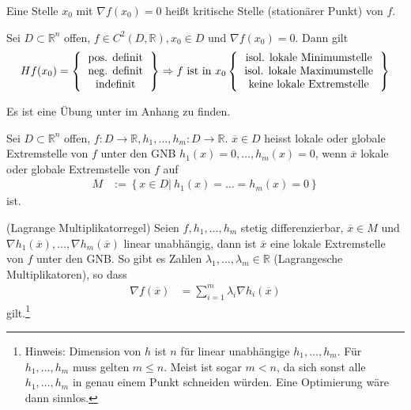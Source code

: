 \begin{defi}
 Eine Stelle $x_0$ mit $\nabla f(x_0)=0$ heißt kritische Stelle (stationärer Punkt) von $f$.
\end{defi}
\begin{satz}\label{satz:2}
Sei $D\subset\mathbb{R}^n$ offen, $f\in C^2(D,\mathbb{R}),x_0\in D$ und $\nabla f(x_0)=0$. Dann gilt 
\begin{align*}
H f(x_0)=\left\{\begin{tabular}{c}pos. definit\\neg. definit\\ indefinit \end{tabular} \right\}\Rightarrow f\text{ ist in }x_0\left\{\begin{tabular}{c}isol. lokale Minimumstelle\\
isol. lokale Maximumstelle\\
keine lokale Extremstelle \end{tabular} \right\}
\end{align*}
\end{satz}
Es ist eine Übung unter  im Anhang zu finden.
\begin{defi}
Sei $D\subset\mathbb{R}^n$ offen, $f:D\rightarrow\mathbb{R},h_1,\ldots,h_m:D\rightarrow\mathbb{R}$. $\overline{x}\in D$ heisst lokale oder globale Extremstelle von $f$ unter den
\ac{GNB} $h_1(x)=0,\ldots,h_m(x)=0$, wenn $\overline{x}$ lokale oder globale Extremstelle von $f$ auf
\begin{align*}
M &:=\left\{x\in D|\ h_1(x)=\ldots=h_m(x)=0\right\}
\end{align*}
ist.
\end{defi}
\begin{satz}\label{satz:3}
(Lagrange Multiplikatorregel) Seien $f,h_1,\ldots,h_m$ stetig differenzierbar, $\overline{x}\in M$ und $\nabla h_1(\overline{x}),\ldots,\nabla h_m(\overline{x})$ linear unabhängig, dann
ist $\overline{x}$ eine lokale Extremstelle von $f$ unter den \ac{GNB}. So gibt es Zahlen $\lambda_1,\ldots,\lambda_m\in\mathbb{R}$ (Lagrangesche Multiplikatoren), so dass
\begin{align*}
\nabla f(\overline{x}) & = \sum\limits_{i=1}^m\lambda_i\nabla h_i(\overline{x})
\end{align*}
gilt.\footnote{Hinweis: Dimension von $h$ ist $n$ für linear unabhängige $h_1,\ldots,h_m$. Für $h_1,\ldots,h_m$
muss gelten $m\le n$. Meist ist sogar $m<n$, da sich sonst alle $h_1,\ldots,h_m$ in genau einem Punkt schneiden würden. Eine Optimierung wäre dann sinnlos.}
\end{satz}
